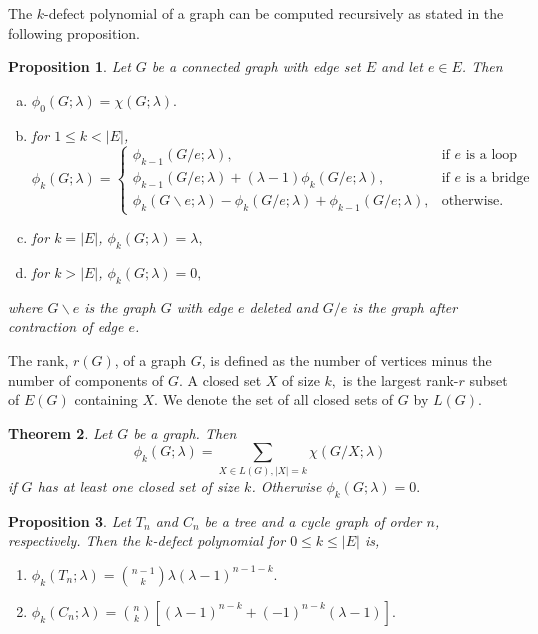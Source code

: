 \documentclass[12pt]{amsart}
\newtheorem{theorem}{Theorem}[section]
\newtheorem{proposition}[theorem]{Proposition}
\theoremstyle{definition}
\theoremstyle{remark}
\numberwithin{equation}{section}
\begin{document}
The $k$-defect polynomial  of a graph
can be computed recursively as stated in  the following  proposition. 
\begin{proposition}
\label{theo333}
Let $G$ be a connected graph with  edge set $E$ and let $e \in E$. Then  
\begin{enumerate}[(a)]
\item $\phi_0(G;\lambda) = \chi(G;\lambda).$
\item for $1 \leq k < |E|$,
\[
\phi_k(G;\lambda) =
\begin{cases}
 \phi_{k-1}(G / e;\lambda), &  \text{if $e$ is a loop}\\
 \phi_{k-1}(G / e;\lambda) + (\lambda -1)\phi_{k}(G / e;\lambda),& \text{if $e$ is a bridge}\\
 \phi_k(G \backslash e ;\lambda) - \phi_k(G / e ;\lambda) + \phi_{k-1}(G / e;\lambda), &\text{otherwise.}
 \end{cases}\]
\item  for $k = |E|$,  $\phi_k(G;\lambda) = \lambda,$
\item  for $k > |E|$,  $\phi_k(G;\lambda) =0,$
\end{enumerate}
where $G\backslash e$ is the graph $G$ with edge $e$ deleted and $G/e$ is the graph after contraction of edge $e$.
 \end{proposition}

The rank,  $r(G)$, of a graph $G$, is defined as the number of vertices  minus  the number of components  of $G.$ A closed set $X$ of size $k,$ is the largest rank-$r$ subset of $E(G)$ containing $X.$  We denote the set of all closed sets  of $G$  by  $L(G).$ 

\begin{theorem}
\label{prop2}
Let $G$ be a graph. Then  $$\phi_{k}(G;\lambda) = \sum_{X \in L(G),\vert X \vert = k} \chi (G/X; \lambda)$$
if $G$ has at least one closed set  of size $k$. Otherwise $\phi_{k}(G;\lambda) = 0.$
\end{theorem}

\begin{proposition}\label{pemb19}
    Let $T_n$ and $C_n$ be a tree and a cycle graph of order $n$, respectively. Then the $k$-defect polynomial for $0 \leq k \leq |E|$ is, 
    \begin{enumerate}
        \item[(i)]  $\phi_k(T_n;\lambda)={{n-1}\choose {k}} \lambda(\lambda-1)^{n-1-k}.$
        \item[(ii)] $\phi_k(C_n;\lambda)={{n}\choose {k}}\left[(\lambda-1)^{n-k}+(-1)^{n-k}(\lambda-1)\right].$
    \end{enumerate}
\end{proposition}
\end{document}
